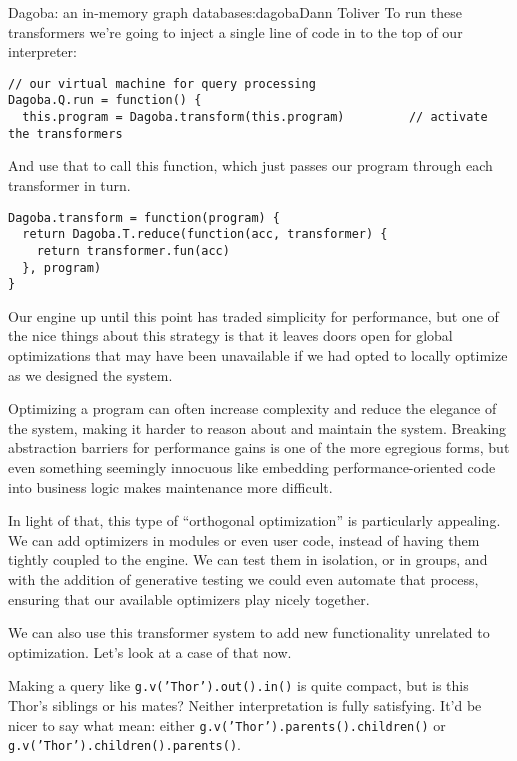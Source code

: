 \begin{aosachapter}{Dagoba: an in-memory graph database}{s:dagoba}{Dann Toliver}
To run these transformers we're going to inject a single line of code in
to the top of our interpreter:

\begin{verbatim}
// our virtual machine for query processing
Dagoba.Q.run = function() {                             
  this.program = Dagoba.transform(this.program)         // activate the transformers
\end{verbatim}

And use that to call this function, which just passes our program
through each transformer in turn.

\begin{verbatim}
Dagoba.transform = function(program) {
  return Dagoba.T.reduce(function(acc, transformer) {
    return transformer.fun(acc)
  }, program)
}
\end{verbatim}

Our engine up until this point has traded simplicity for performance,
but one of the nice things about this strategy is that it leaves doors
open for global optimizations that may have been unavailable if we had
opted to locally optimize as we designed the system.

Optimizing a program can often increase complexity and reduce the
elegance of the system, making it harder to reason about and maintain
the system. Breaking abstraction barriers for performance gains is one
of the more egregious forms, but even something seemingly innocuous like
embedding performance-oriented code into business logic makes
maintenance more difficult.

In light of that, this type of ``orthogonal optimization'' is
particularly appealing. We can add optimizers in modules or even user
code, instead of having them tightly coupled to the engine. We can test
them in isolation, or in groups, and with the addition of generative
testing we could even automate that process, ensuring that our available
optimizers play nicely together.

We can also use this transformer system to add new functionality
unrelated to optimization. Let's look at a case of that now.

\label{aliases}

Making a query like \texttt{g.v('Thor').out().in()} is quite compact,
but is this Thor's siblings or his mates? Neither interpretation is
fully satisfying. It'd be nicer to say what mean: either
\texttt{g.v('Thor').parents().children()} or
\texttt{g.v('Thor').children().parents()}.


\end{aosachapter}
